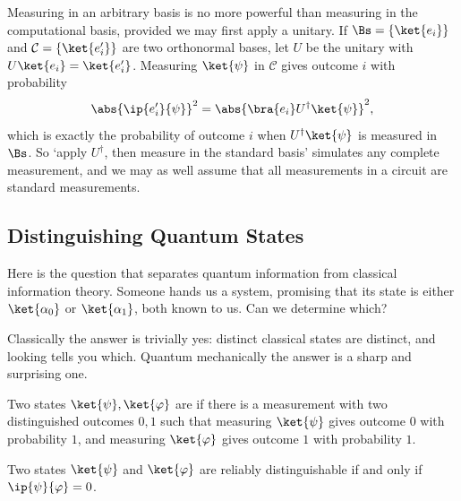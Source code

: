 \begin{remark}
	Measuring in an arbitrary basis is no more powerful than measuring in the computational basis, provided we may first apply a unitary. If $\Bs = \{\ket{e_i}\}$ and $\mathcal C = \{\ket{e_i'}\}$ are two orthonormal bases, let $U$ be the unitary with $U\ket{e_i} = \ket{e_i'}$. Measuring $\ket{\psi}$ in $\mathcal{C}$ gives outcome $i$ with probability
	$$\abs{\ip{e_i'}{\psi}}^2 = \abs{\bra{e_i}U^\dagger\ket{\psi}}^2,$$
	which is exactly the probability of outcome $i$ when $U^\dagger\ket{\psi}$ is measured in $\Bs$. So `apply $U^\dagger$, then measure in the standard basis' simulates any complete measurement, and we may as well assume that all measurements in a circuit are standard measurements.
\end{remark}

\subsection{Distinguishing Quantum States}\label{sec:distinguish}

Here is the question that separates quantum information from classical information theory. Someone hands us a system, promising that its state is either $\ket{\alpha_0}$ or $\ket{\alpha_1}$, both known to us. Can we determine which?

Classically the answer is trivially yes: distinct classical states are distinct, and looking tells you which. Quantum mechanically the answer is a sharp and surprising one.

\begin{definition}
	Two states $\ket{\psi},\ket{\varphi}$ are  if there is a measurement with two distinguished outcomes $0,1$ such that measuring $\ket{\psi}$ gives outcome $0$ with probability $1$, and measuring $\ket{\varphi}$ gives outcome $1$ with probability $1$.
\end{definition}

\begin{theorem}
	Two states $\ket{\psi}$ and $\ket{\varphi}$ are reliably distinguishable if and only if $\ip{\psi}{\varphi} = 0$.
\end{theorem}

